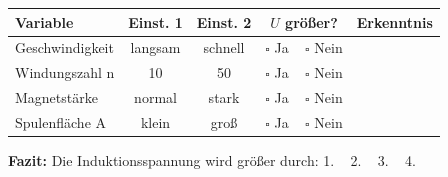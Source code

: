 \documentclass[11pt,a4paper]{article}
\newcommand{\luecke}[1]{\underline{\hspace{#1}}}
\begin{document}
\vspace{0.3em}

\begin{protokollbox}[title=Kasten 2: Einflussfaktoren -- Was erhöht die Spannung?]
\small
\renewcommand{\arraystretch}{1.2}
\begin{tabular}{|p{3.2cm}|c|c|c|p{4cm}|}
\hline
\textbf{Variable} & \textbf{Einst. 1} & \textbf{Einst. 2} & \textbf{$U$ größer?} & \textbf{Erkenntnis} \\
\hline
Geschwindigkeit & langsam & schnell & $\square$ Ja ~ $\square$ Nein & \\[0.25cm]
\hline
Windungszahl n & 10 & 50 & $\square$ Ja ~ $\square$ Nein & \\[0.25cm]
\hline
Magnetstärke & normal & stark & $\square$ Ja ~ $\square$ Nein & \\[0.25cm]
\hline
Spulenfläche A & klein & groß & $\square$ Ja ~ $\square$ Nein & \\[0.25cm]
\hline
\end{tabular}

\vspace{0.2em}
\textbf{Fazit:} Die Induktionsspannung wird größer durch:
1. \luecke{3cm} ~ 2. \luecke{3cm} ~ 3. \luecke{3cm} ~ 4. \luecke{3cm}
\end{protokollbox}

\vspace{0.3em}
\end{document}
